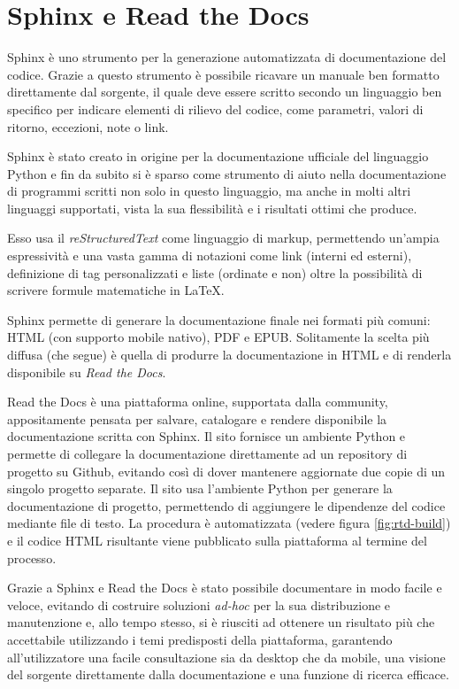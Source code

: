 \section{Sphinx e Read the Docs}
\label{seq:sphinx-rtd}
Sphinx è uno strumento per la generazione automatizzata di documentazione
del codice. Grazie a questo strumento è possibile ricavare un manuale
ben formatto direttamente dal sorgente, il quale deve essere scritto
secondo un linguaggio ben specifico per indicare elementi di rilievo
del codice, come parametri, valori di ritorno, eccezioni,
note o link.

Sphinx è stato creato in origine per la documentazione ufficiale
del linguaggio Python\cite{python-doc} e fin da subito si è sparso
come strumento di aiuto nella documentazione di programmi scritti
non solo in questo linguaggio, ma anche in molti altri linguaggi supportati,
vista la sua flessibilità e i risultati ottimi che produce.

Esso usa il \emph{reStructuredText} come linguaggio di markup, permettendo
un'ampia espressività e una vasta gamma di notazioni come link (interni ed esterni),
definizione di tag personalizzati e liste (ordinate e non) oltre la possibilità
di scrivere formule matematiche in \LaTeX.

Sphinx permette di generare la documentazione finale nei formati più comuni:
HTML (con supporto mobile nativo), PDF e EPUB. Solitamente la scelta
più diffusa (che \pygfa segue) è quella di produrre la documentazione in
HTML e di renderla disponibile su \emph{Read the Docs}.

\label{seq:sphinx}
Read the Docs è una piattaforma online, supportata dalla community,
appositamente pensata per salvare, catalogare e rendere disponibile
la documentazione scritta con Sphinx.
Il sito fornisce un ambiente Python e permette di collegare la documentazione
direttamente ad un repository di progetto su Github, evitando così di
dover mantenere aggiornate due copie di un singolo progetto separate.
Il sito usa l'ambiente Python per generare la documentazione di
progetto, permettendo di aggiungere le dipendenze del codice mediante
file di testo. La procedura è automatizzata (vedere figura
\ref{fig:rtd-build}) e il codice HTML risultante viene pubblicato sulla
piattaforma al termine del processo.

Grazie a Sphinx e Read the Docs è stato possibile documentare \pygfa
in modo facile e veloce, evitando di costruire soluzioni \emph{ad-hoc}
per la sua distribuzione e manutenzione e, allo tempo stesso,
si è riusciti ad ottenere un risultato più che accettabile utilizzando
i temi predisposti della piattaforma, garantendo all'utilizzatore
una facile consultazione sia da desktop che da mobile, una visione
del sorgente direttamente dalla documentazione e una funzione
di ricerca efficace.

